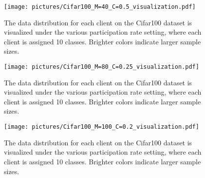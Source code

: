 \begin{figure}[ht]
    \centering
    \texttt{[image: pictures/Cifar100\_M=40\_C=0.5\_visualization.pdf]}
    \caption{The data distribution for each client on the Cifar100 dataset is visualized under the various participation rate setting, where each client is assigned 10 classes. Brighter colors indicate larger sample sizes.}
    \label{fig:Cifar100_M=40_C=0.5_visualization}
\end{figure}

\begin{figure}[ht]
    \centering
    \texttt{[image: pictures/Cifar100\_M=80\_C=0.25\_visualization.pdf]}
    \caption{The data distribution for each client on the Cifar100 dataset is visualized under the various participation rate setting, where each client is assigned 10 classes. Brighter colors indicate larger sample sizes.}
    \label{fig:Cifar100_M=80_C=0.25_visualization}
\end{figure}

\begin{figure}[ht]
    \centering
    \texttt{[image: pictures/Cifar100\_M=100\_C=0.2\_visualization.pdf]}
    \caption{The data distribution for each client on the Cifar100 dataset is visualized under the various participation rate setting, where each client is assigned 10 classes. Brighter colors indicate larger sample sizes.}
    \label{fig:Cifar100_M=100_C=0.2_visualization}
\end{figure}